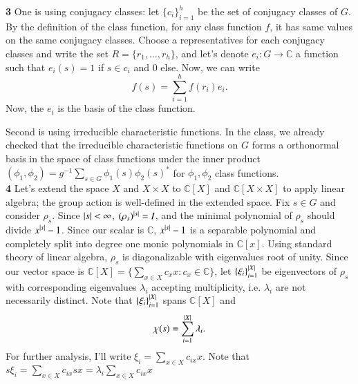 \documentclass[a4paper, 12pt]{article}
\theoremstyle{Mydefinition}
\theoremstyle{Mytheorem}
\begin{document}
\noindent \textbf{3}
One is using conjugacy classes: let $\{c_i\}_{i=1}^h$ be the set of conjugacy classes of $G$. By the definition of the class function, for any class function $f$, it has same values on the same conjugacy classes. Choose a representatives for each conjugacy classes and write the set $R=\{r_1,\ldots, r_h\}$, and let's denote $e_i:G\rightarrow \mathbb{C}$ a function such that $e_i(s) = 1$ if $s\in c_i$ and $0$ else. Now, we can write
\begin{equation}
    f(s) = \sum_{i=1}^h f(r_i)e_i.
\end{equation}
Now, the $e_i$ is the basis of the class function.

Second is using irreducible characteristic functions. In the class, we already checked that the irreducible characteristic functions on $G$ forms a orthonormal basis in the space of class functions under the inner product $(\phi_1, \phi_2) = g^{-1}\sum_{s\in G}\phi_1(s)\phi_2(s)^*$ for $\phi_1,\phi_2$ class functions.\\

\noindent \textbf{4}
Let's extend the space $X$ and $X\times X$ to $\mathbb{C}[X]$ and $\mathbb{C}[X\times X]$ to apply linear algebra; the group action is well-defined in the extended space. Fix $s\in G$ and consider $\rho_s$. Since $\abs{s}<\infty$, $(\rho_s)^{\abs{s}} = I$, and the minimal polynomial of $\rho_s$ should divide $x^{\abs{s}}-1$. Since our scalar is $\mathbb{C}$, $x^{\abs{s}}-1$ is a separable polynomial and completely split into degree one monic polynomials in $\mathbb{C}[x]$. Using standard theory of linear algebra, $\rho_s$ is diagonalizable with eigenvalues root of unity. Since our vector space is $\mathbb{C}[X] = \{\sum_{x\in X}c_x x:c_x\in \mathbb{C}\}$, let $\{\xi_i\}_{i=1}^{\abs{X}}$ be eigenvectors of $\rho_s$ with corresponding eigenvalues $\lambda_i$ accepting multiplicity, i.e. $\lambda_i$ are not necessarily distinct. Note that $\{\xi_i\}_{i=1}^{\abs{X}}$ spans $\mathbb{C}[X]$ and
\begin{equation}
    \chi(s) = \sum_{i=1}^{\abs{X}} \lambda_i.
\end{equation}
For further analysis, I'll write $\xi_i = \sum_{x\in X} c_{ix}x$. Note that $s\xi_i = \sum_{x\in X} c_{ix}sx = \lambda_i\sum_{x\in X} c_{ix}x$
\end{document}
